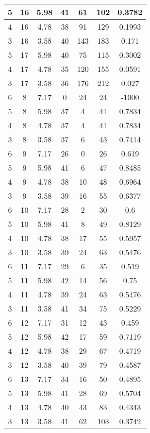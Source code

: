 \documentclass[letterpaper, 12pt]{article}
\begin{document}
\begin{longtable}{|c|c|c|c|c|c|c|}
\hline
5 & 16 & 5.98 & 41 & 61 & 102 & 0.3782 \\
\hline
4 & 16 & 4.78 & 38 & 91 & 129 & 0.1993 \\
\hline
3 & 16 & 3.58 & 40 & 143 & 183 & 0.171 \\
\hline
5 & 17 & 5.98 & 40 & 75 & 115 & 0.3002 \\
\hline
4 & 17 & 4.78 & 35 & 120 & 155 & 0.0591 \\
\hline
3 & 17 & 3.58 & 36 & 176 & 212 & 0.027 \\
\hline
6 & 8 & 7.17 & 0 & 24 & 24 & -1000 \\
\hline
5 & 8 & 5.98 & 37 & 4 & 41 & 0.7834 \\
\hline
4 & 8 & 4.78 & 37 & 4 & 41 & 0.7834 \\
\hline
3 & 8 & 3.58 & 37 & 6 & 43 & 0.7414 \\
\hline
6 & 9 & 7.17 & 26 & 0 & 26 & 0.619 \\
\hline
5 & 9 & 5.98 & 41 & 6 & 47 & 0.8485 \\
\hline
4 & 9 & 4.78 & 38 & 10 & 48 & 0.6964 \\
\hline
3 & 9 & 3.58 & 39 & 16 & 55 & 0.6377 \\
\hline
6 & 10 & 7.17 & 28 & 2 & 30 & 0.6 \\
\hline
5 & 10 & 5.98 & 41 & 8 & 49 & 0.8129 \\
\hline
4 & 10 & 4.78 & 38 & 17 & 55 & 0.5957 \\
\hline
3 & 10 & 3.58 & 39 & 24 & 63 & 0.5476 \\
\hline
6 & 11 & 7.17 & 29 & 6 & 35 & 0.519 \\
\hline
5 & 11 & 5.98 & 42 & 14 & 56 & 0.75 \\
\hline
4 & 11 & 4.78 & 39 & 24 & 63 & 0.5476 \\
\hline
3 & 11 & 3.58 & 41 & 34 & 75 & 0.5229 \\
\hline
6 & 12 & 7.17 & 31 & 12 & 43 & 0.459 \\
\hline
5 & 12 & 5.98 & 42 & 17 & 59 & 0.7119 \\
\hline
4 & 12 & 4.78 & 38 & 29 & 67 & 0.4719 \\
\hline
3 & 12 & 3.58 & 40 & 39 & 79 & 0.4587 \\
\hline
6 & 13 & 7.17 & 34 & 16 & 50 & 0.4895 \\
\hline
5 & 13 & 5.98 & 41 & 28 & 69 & 0.5704 \\
\hline
4 & 13 & 4.78 & 40 & 43 & 83 & 0.4343 \\
\hline
3 & 13 & 3.58 & 41 & 62 & 103 & 0.3742 \\

\end{longtable}
\end{document}
